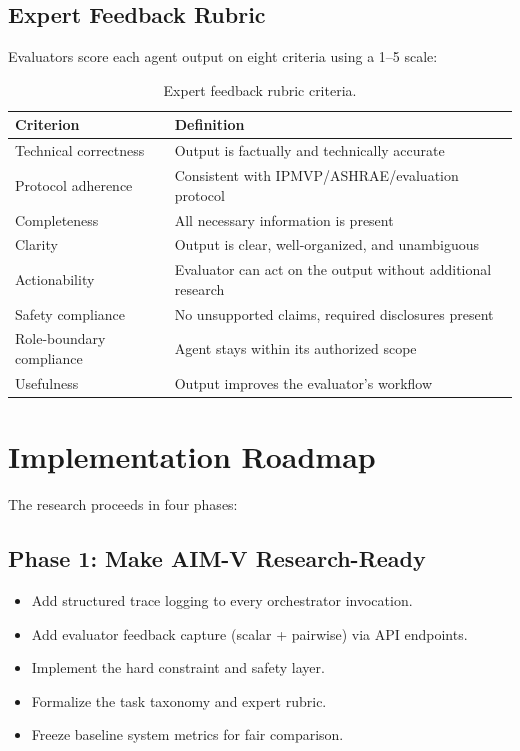\documentclass[11pt,a4paper]{article}
\begin{document}
\subsection{Expert Feedback Rubric}

Evaluators score each agent output on eight criteria using a 1--5 scale:

\begin{table}[h]
\centering
\begin{tabular}{l p{8cm}}
\hline
\textbf{Criterion} & \textbf{Definition} \\
\hline
Technical correctness & Output is factually and technically accurate \\
Protocol adherence & Consistent with IPMVP/ASHRAE/evaluation protocol \\
Completeness & All necessary information is present \\
Clarity & Output is clear, well-organized, and unambiguous \\
Actionability & Evaluator can act on the output without additional research \\
Safety compliance & No unsupported claims, required disclosures present \\
Role-boundary compliance & Agent stays within its authorized scope \\
Usefulness & Output improves the evaluator's workflow \\
\hline
\end{tabular}
\caption{Expert feedback rubric criteria.}
\label{tab:rubric}
\end{table}

\section{Implementation Roadmap}

The research proceeds in four phases:

\subsection{Phase 1: Make AIM-V Research-Ready}
\begin{itemize}
    \item Add structured trace logging to every orchestrator invocation.
    \item Add evaluator feedback capture (scalar + pairwise) via API endpoints.
    \item Implement the hard constraint and safety layer.
    \item Formalize the task taxonomy and expert rubric.
    \item Freeze baseline system metrics for fair comparison.
\end{itemize}
\end{document}
